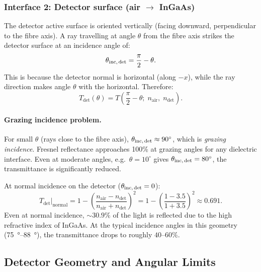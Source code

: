 \subsubsection{Interface 2: Detector surface (air $\to$ InGaAs)}

The detector active surface is oriented vertically (facing downward,
perpendicular to the fibre axis).  A ray travelling at angle $\theta$
from the fibre axis strikes the detector surface at an incidence angle
of:
%
\begin{equation}\label{eq:det-angle}
  \theta_\text{inc,\,det} = \frac{\pi}{2} - \theta.
\end{equation}
%
This is because the detector normal is horizontal (along $-x$), while
the ray direction makes angle $\theta$ with the horizontal.
Therefore:
%
\begin{equation}\label{eq:T-det}
  T_\text{det}(\theta) = T\!\left(\frac{\pi}{2} - \theta;\;
    n_\text{air},\; n_\text{det}\right).
\end{equation}
%
\paragraph{Grazing incidence problem.}
For small $\theta$ (rays close to the fibre axis),
$\theta_\text{inc,\,det} \approx 90^\circ$, which is \emph{grazing
incidence}.  Fresnel reflectance approaches 100\% at grazing angles
for any dielectric interface.  Even at moderate angles, e.g.\
$\theta = 10^\circ$ gives $\theta_\text{inc,\,det} = 80^\circ$,
the transmittance is significantly reduced.

At normal incidence on the detector ($\theta_\text{inc,\,det} = 0$):
%
\begin{equation}
  T_\text{det}\big|_\text{normal}
  = 1 - \left(\frac{n_\text{air} - n_\text{det}}
                    {n_\text{air} + n_\text{det}}\right)^{\!2}
  = 1 - \left(\frac{1 - 3.5}{1 + 3.5}\right)^{\!2}
  \approx 0.691.
\end{equation}
%
Even at normal incidence, ${\sim}30.9\%$ of the light is reflected due
to the high refractive index of InGaAs.  At the typical incidence angles
in this geometry (\SIrange{75}{88}{\degree}), the transmittance drops
to roughly $40$--$60\%$.

\subsection{Detector Geometry and Angular Limits}

